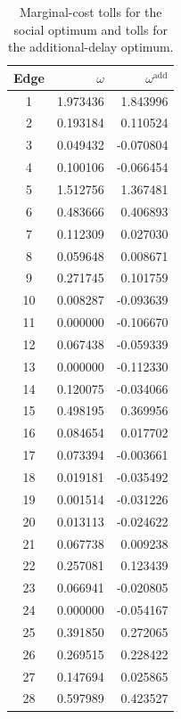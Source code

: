 \documentclass[11pt,a4paper]{article}
\begin{document}
\begin{table}[h]
\centering
\scriptsize
\begin{tabular}{c|r|r}
\hline
Edge & \(\omega\) & \(\omega^{\mathrm{add}}\)\\
\hline
1 & 1.973436 & 1.843996\\
2 & 0.193184 & 0.110524\\
3 & 0.049432 & -0.070804\\
4 & 0.100106 & -0.066454\\
5 & 1.512756 & 1.367481\\
6 & 0.483666 & 0.406893\\
7 & 0.112309 & 0.027030\\
8 & 0.059648 & 0.008671\\
9 & 0.271745 & 0.101759\\
10 & 0.008287 & -0.093639\\
11 & 0.000000 & -0.106670\\
12 & 0.067438 & -0.059339\\
13 & 0.000000 & -0.112330\\
14 & 0.120075 & -0.034066\\
15 & 0.498195 & 0.369956\\
16 & 0.084654 & 0.017702\\
17 & 0.073394 & -0.003661\\
18 & 0.019181 & -0.035492\\
19 & 0.001514 & -0.031226\\
20 & 0.013113 & -0.024622\\
21 & 0.067738 & 0.009238\\
22 & 0.257081 & 0.123439\\
23 & 0.066941 & -0.020805\\
24 & 0.000000 & -0.054167\\
25 & 0.391850 & 0.272065\\
26 & 0.269515 & 0.228422\\
27 & 0.147694 & 0.025865\\
28 & 0.597989 & 0.423527\\
\hline
\end{tabular}
\caption{Marginal-cost tolls for the social optimum and tolls for the
additional-delay optimum.}
\label{tab:exercise3-tolls}
\end{table}
\end{document}
